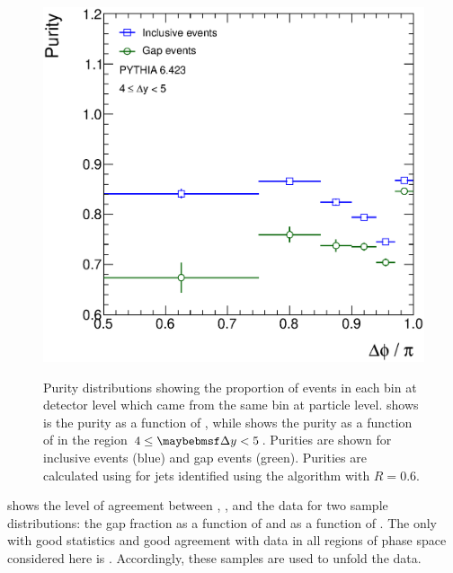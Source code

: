 \begin{figure}[htpb]
{    \includegraphics[width=\smallfigwidth]{chapters/azimuthal-decorrelation/Purity.DPhiBins.4dY5.eps}
    \label{fig:azimuthal-decorrelation:purity_dPhi}}
  \caption{Purity distributions showing the proportion of events in each bin at
           detector level which came from the same bin at particle level. \protect{} shows
           is the purity as a function of \DeltaY, while \protect{} shows the purity as a
           function of \DeltaPhi in the region $4 \leq \DeltaY < 5$. Purities are
           shown for inclusive events (blue) and gap events (green). Purities are
           calculated using \Pythia \MC for jets identified using the \akt algorithm
           with $R=0.6$.}
  \label{fig:azimuthal-decorrelation:purities}
\end{figure}

 shows the level of agreement
between \Pythia, \Herwigpp, \Alpgen and the data for two sample distributions: the
gap fraction as a function of \DeltaY and as a function of \Qnought. The only \MC
with good statistics and good agreement with data in all regions of phase space
considered here is \Pythia. Accordingly, these \Pythia samples are used to unfold
the data.

